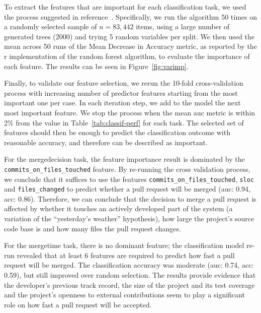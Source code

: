\documentclass{sig-alternate}
\begin{document}
To extract the features that are important for each classification task, we used
the process suggested in reference~\cite{Genue10}. Specifically, we run the
algorithm 50 times on a randomly selected sample of $n = 83,442$ items, using a
large number of generated trees (2000) and trying 5 random variables per split.
We then used the mean across 50 runs of the  Mean Decrease in Accuracy metric,
as reported by the {\sc r} implementation of the random forest algorithm, to
evaluate the importance of each feature. The results can be seen in
Figure~\ref{fig:varimp}.

Finally, to validate our feature selection, we rerun the 10-fold
cross-validation process with increasing number of predictor features starting
from the most important one per case. In each iteration step, we add to the
model the next most important feature. We stop the process when the mean {\sc
auc} metric is within 2\% from the value in Table~\ref{tab:classif-perf} for
each task. The selected set of features should then be enough to predict the
classification outcome with reasonable accuracy, and therefore can be described
as important.

For the \textsf{mergedecision} task, the feature importance result is dominated
by the \texttt{commits\_\-on\_\-files\_\-touched} feature. By re-running the cross
validation process, we conclude that it suffices to use the features
 \texttt{commits\_\-on\_\-files\_\-touched}, \texttt{sloc} and \texttt{files\_changed}
to predict whether a pull request will be merged ({\sc auc:} 0.94, {\sc acc}:
0.86). Therefore, we can conclude that the decision to merge a pull request is
affected by whether it touches an actively developed part of the system (a
variation of the ``yesterday's weather'' hypothesis), how large the project's
source code base is and how many files the pull request changes.


For the \textsf{mergetime} task, there is no dominant feature; the
classification model re-run revealed that at least 6 features are required to
predict how fast a pull request will be merged. The classification accuracy was
moderate ({\sc auc:} 0.74, {\sc acc}: 0.59), but still improved over random
selection. The results provide evidence that the developer's previous
track record, the size of the project and its test coverage and the project's
openness to external contributions seem to play a significant role on
how fast a pull request will be accepted.
\end{document}

